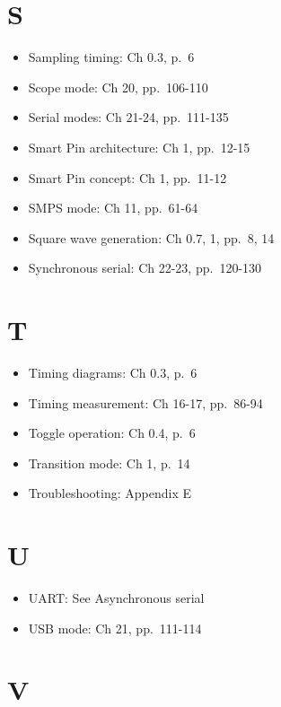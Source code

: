 \documentclass[11pt,a4paper,oneside,english]{book}
\begin{document}
\hypertarget{s}{%
\section{S}\label{s}}

\begin{itemize}
\tightlist
\item
  Sampling timing: Ch 0.3, p.~6
\item
  Scope mode: Ch 20, pp.~106-110
\item
  Serial modes: Ch 21-24, pp.~111-135
\item
  Smart Pin architecture: Ch 1, pp.~12-15
\item
  Smart Pin concept: Ch 1, pp.~11-12
\item
  SMPS mode: Ch 11, pp.~61-64
\item
  Square wave generation: Ch 0.7, 1, pp.~8, 14
\item
  Synchronous serial: Ch 22-23, pp.~120-130
\end{itemize}

\hypertarget{t}{%
\section{T}\label{t}}

\begin{itemize}
\tightlist
\item
  Timing diagrams: Ch 0.3, p.~6
\item
  Timing measurement: Ch 16-17, pp.~86-94
\item
  Toggle operation: Ch 0.4, p.~6
\item
  Transition mode: Ch 1, p.~14
\item
  Troubleshooting: Appendix E
\end{itemize}

\hypertarget{u}{%
\section{U}\label{u}}

\begin{itemize}
\tightlist
\item
  UART: See Asynchronous serial
\item
  USB mode: Ch 21, pp.~111-114
\end{itemize}

\hypertarget{v}{%
\section{V}\label{v}}
\end{document}
